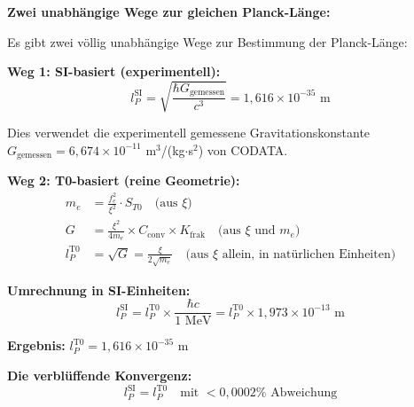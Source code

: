 	\begin{historical}
		\textbf{Zwei unabhängige Wege zur gleichen Planck-Länge:}
		
		Es gibt zwei völlig unabhängige Wege zur Bestimmung der Planck-Länge:
		
		\textbf{Weg 1: SI-basiert (experimentell):}
		\begin{equation}
			l_P^{\text{SI}} = \sqrt{\frac{\hbar G_{\text{gemessen}}}{c^3}} = 1{,}616 \times 10^{-35} \text{ m}
		\end{equation}
		
		Dies verwendet die experimentell gemessene Gravitationskonstante $G_{\text{gemessen}} = 6{,}674 \times 10^{-11}$ m$^3$/(kg$\cdot$s$^2$) von CODATA.
		
		\textbf{Weg 2: T0-basiert (reine Geometrie):}
		\begin{align}
			m_e &= \frac{f_e^2}{\xi^2} \cdot S_{T0} \quad \text{(aus } \xi\text{)} \\
			G &= \frac{\xi^2}{4m_e} \times C_{\text{conv}} \times K_{\text{frak}} \quad \text{(aus } \xi \text{ und } m_e\text{)} \\
			l_P^{\text{T0}} &= \sqrt{G} = \frac{\xi}{2\sqrt{m_e}} \quad \text{(aus } \xi \text{ allein, in natürlichen Einheiten)}
		\end{align}
		
		\textbf{Umrechnung in SI-Einheiten:}
		\begin{equation}
			l_P^{\text{SI}} = l_P^{\text{T0}} \times \frac{\hbar c}{1 \text{ MeV}} = l_P^{\text{T0}} \times 1{,}973 \times 10^{-13} \text{ m}
		\end{equation}
		
		\textbf{Ergebnis:} $l_P^{\text{T0}} = 1{,}616 \times 10^{-35}$ m
		
		\textbf{Die verblüffende Konvergenz:}
		\begin{equation}
			\boxed{l_P^{\text{SI}} = l_P^{\text{T0}} \quad \text{mit } <0{,}0002\% \text{ Abweichung}}
		\end{equation}
	\end{historical}
	
